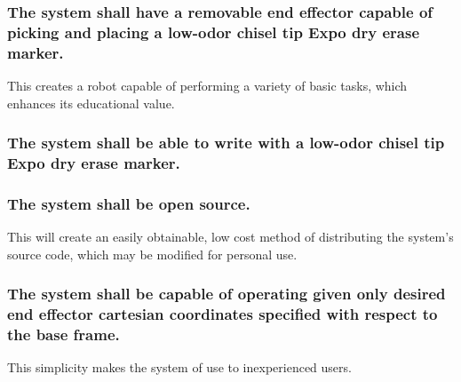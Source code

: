 \subsubsection{The system shall have a removable end effector capable of picking and placing a low-odor chisel tip Expo dry erase marker.}
This creates a robot capable of performing a variety of basic tasks, which enhances its educational value.

\subsubsection{The system shall be able to write with a low-odor chisel tip Expo dry erase marker.}

\subsubsection{The system shall be open source.}
This will create an easily obtainable, low cost method of distributing the system’s source code, which may be modified for personal use.

\subsubsection{The system shall be capable of operating given only desired end effector cartesian coordinates specified with respect to the base frame.}
This simplicity makes the system of use to inexperienced users.
